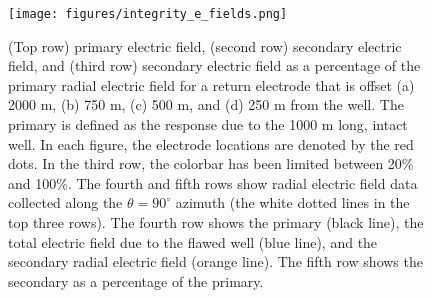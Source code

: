 \begin{figure}
    \begin{center}
    \texttt{[image: figures/integrity\_e\_fields.png]}
    \end{center}
\caption{
    (Top row) primary electric field, (second row) secondary electric field,
    and (third row) secondary electric field as a percentage of the primary radial electric field
    for a return electrode that is offset (a) 2000 m, (b) 750 m, (c) 500 m, and (d) 250 m
    from the well. The primary is defined as the response due to the 1000 m
    long, intact well. In each figure, the electrode locations are denoted by
    the red dots. In the third row, the colorbar has been limited
    between 20\% and 100\%. The fourth and fifth rows show radial electric field data
    collected along the $\theta=90^\circ$ azimuth (the white dotted lines in
    the top three rows). The fourth row shows the primary (black line), the total
    electric field due to the flawed well (blue line), and the secondary
    radial electric field (orange line). The fifth row shows the secondary as a
    percentage of the primary.
}
\label{fig:integrity_e_fields}
\end{figure}
